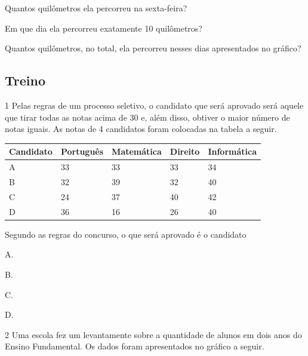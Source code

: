 \begin{mdframed}[linewidth=2pt,linecolor=salmao,roundcorner=2pt]
\begin{escolha}
{\begin{escolha}

\item
  Quantos quilômetros ela percorreu na sexta-feira?


\item
  Em que dia ela percorreu exatamente 10 quilômetros?


\item
  Quantos quilômetros, no total, ela percorreu nesses dias apresentados no gráfico?

\end{escolha}


\subsection{Treino}

\num{1} Pelas regras de um processo seletivo, o candidato que será aprovado será
aquele que tirar todas as notas acima de 30 e, além disso, obtiver o maior
número de notas iguais. As notas de 4 candidatos foram colocadas na
tabela a seguir.

\begin{longtable}[]{@{}lllll@{}}
\toprule
Candidato & Português & Matemática & Direito &
Informática\tabularnewline
\midrule
\endhead
A & 33 & 33 & 33 & 34\tabularnewline
B & 32 & 39 & 32 & 40\tabularnewline
C & 24 & 37 & 40 & 42\tabularnewline
D & 36 & 16 & 26 & 40\tabularnewline
\bottomrule
\end{longtable}

Segundo as regras do concurso, o que será aprovado é o candidato

\begin{escolha}
\item
  A.
\item
  B.
\item
  C.
\item
  D.
\end{escolha}




\num{2} Uma escola fez um levantamente sobre a quantidade de alunos em dois anos
do Ensino Fundamental. Os dados foram apresentados no gráfico a seguir.


}
\end{escolha}
\end{mdframed}
